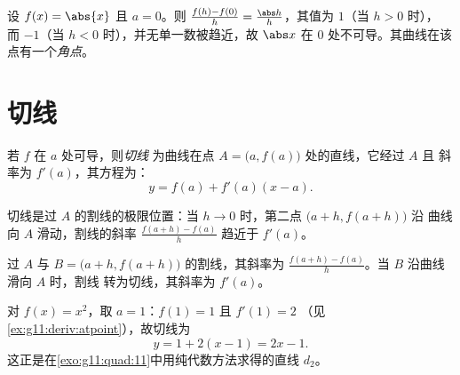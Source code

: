 \begin{example}[不可导的点]
设 $f(x) = \abs{x}$ 且 $a = 0$。则
$\frac{f(h) - f(0)}{h} = \frac{\abs h}{h}$，其值为 $1$（当 $h > 0$ 时），
而 $-1$（当 $h < 0$ 时），并无单一数被趋近，故 $\abs x$ 在
$0$ 处不可导。其曲线在该点有一个\emph{角点}。
\end{example}

\section{切线}

\begin{definition}[切线]\label{def:g11:deriv:tangent}
若 $f$ 在 $a$ 处可导，则\emph{切线}
为曲线在点 $A = \bigl(a, f(a)\bigr)$ 处的直线，它经过 $A$ 且
斜率为 $f'(a)$，其方程为：
\[
y = f(a) + f'(a)(x - a).
\]
\end{definition}

切线是过 $A$ 的割线的极限位置：当
$h \to 0$ 时，第二点 $\bigl(a+h, f(a+h)\bigr)$ 沿
曲线向 $A$ 滑动，割线的斜率 $\frac{f(a+h)-f(a)}{h}$
趋近于 $f'(a)$。

\begin{omfigure}

{\small 过 $A$ 与 $B = \bigl(a+h, f(a+h)\bigr)$ 的割线，其斜率为
$\frac{f(a+h)-f(a)}{h}$。当 $B$ 沿曲线滑向 $A$ 时，割线
转为切线，其斜率为 $f'(a)$。}
\end{omfigure}

\begin{example}\label{ex:g11:deriv:tangenteq}
对 $f(x) = x^2$，取 $a = 1$：$f(1) = 1$ 且 $f'(1) = 2$
（见\cref{ex:g11:deriv:atpoint}），故切线为
\[
y = 1 + 2(x - 1) = 2x - 1 .
\]
这正是在\cref{exo:g11:quad:11}中用纯代数方法求得的直线 $d_2$。
\end{example}

